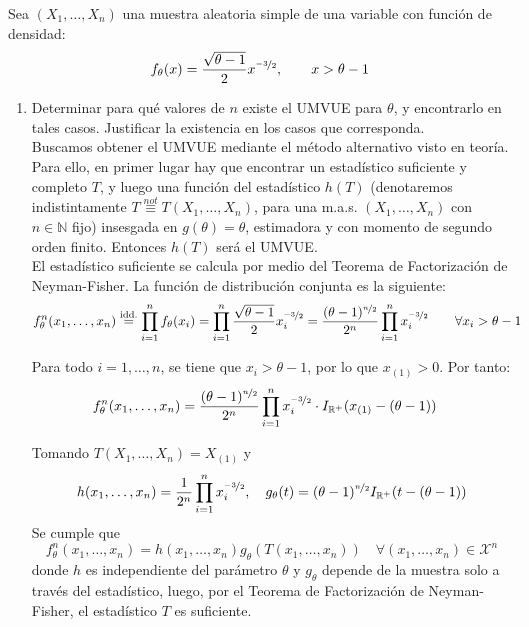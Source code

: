 \documentclass[12pt]{article}
\newcommand{\R}{\mathbb{R}}
\newcommand{\Rmas}{\R^{+}}
\newcommand{\X}{\mathcal{X}}
\newcommand{\N}{\mathbb{N}}
\begin{document}
    \begin{ejercicio}[2.5 puntos]
        Sea $(X_1,\ldots,X_n)$ una muestra aleatoria simple de una variable con función de densidad:
        \begin{equation*}
            f_\theta(x) = \frac{\sqrt{\theta-1}}{2}x^{\nicefrac{-3}{2}}, \qquad x>\theta-1
        \end{equation*}
        \begin{enumerate}[label=\alph*)]
            \item Determinar para qué valores de $n$ existe el UMVUE para $\theta$, y encontrarlo en tales casos. Justificar la existencia en los casos que corresponda. \\
            
            Buscamos obtener el UMVUE mediante el método alternativo visto en teoría. Para ello, en primer lugar hay que encontrar un estadístico suficiente y completo $T$, y luego una función del estadístico $h(T)$
            (denotaremos indistintamente $T \stackrel{not}{\equiv} T(X_1, \ldots, X_n)$, para una m.a.s. $(X_1, \ldots, X_n)$ con $n \in \N$ fijo) insesgada en $g(\theta) = \theta$, estimadora y con momento de segundo orden finito. Entonces $h(T)$ será el UMVUE. \\

            El estadístico suficiente se calcula por medio del Teorema de Factorización de Neyman-Fisher. La función de distribución conjunta es la siguiente:
            \begin{align*}
                f_\theta^n(x_1, \ldots, x_n) &\stackrel{\text{idd.}}{=} \prod_{i=1}^{n} f_\theta(x_i) = \prod_{i=1}^{n} \frac{\sqrt{\theta-1}}{2}x_i^{\nicefrac{-3}{2}}
                = \frac{(\theta-1)^{\nicefrac{n}{2}}}{2^n} \prod_{i=1}^{n} x_i^{\nicefrac{-3}{2}}\qquad \forall x_i > \theta-1
            \end{align*}

            Para todo $i=1, \ldots, n$, se tiene que $x_i > \theta-1$, por lo que $x_{(1)}>0$. Por tanto:
            \begin{align*}
                f_\theta^n(x_1, \ldots, x_n) &= \frac{(\theta-1)^{\nicefrac{n}{2}}}{2^n} \prod_{i=1}^{n} x_i^{\nicefrac{-3}{2}}\cdot I_{\mathbb{R}^+}(x_{(1)} - (\theta-1))
            \end{align*}
            
            Tomando $T(X_1, \ldots, X_n) = X_{(1)}$ y 
            $$h(x_1, \ldots, x_n) = \dfrac{1}{2^n}\prod_{i=1}^{n} x_i^{\nicefrac{-3}{2}}, \quad g_\theta(t) = 
            (\theta-1)^{\nicefrac{n}{2}} I_{\Rmas}(t - (\theta - 1))$$
            Se cumple que 
            $$f^n_\theta(x_1, \ldots, x_n) = h(x_1, \ldots, x_n) g_\theta(T(x_1, \ldots, x_n)) \quad \forall (x_1, \ldots, x_n) \in \X^n$$
            donde $h$ es independiente del parámetro $\theta$ y $g_\theta$ depende de la muestra solo a través del estadístico, luego,
            por el Teorema de Factorización de Neyman-Fisher, el estadístico $T$ es suficiente. 


\end{enumerate}
\end{ejercicio}
\end{document}
